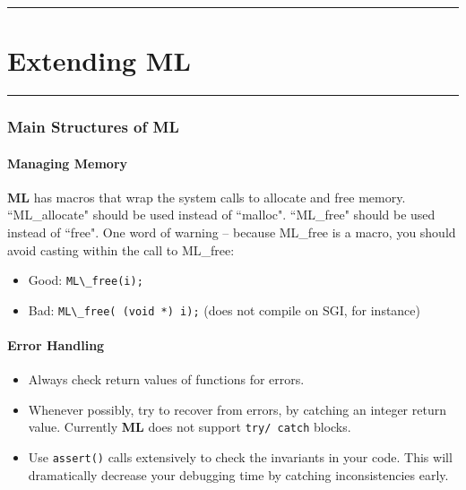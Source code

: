 \documentclass[10pt,letter,relax]{SANDreport}
\newcommand{\HRule}{\noindent\rule{\linewidth}{1mm}}
\newcommand{\ML}     {{\bf ML }}
\begin{document}

\clearpage
\newpage

\vspace*{3cm}
\HRule
\part{Extending ML}

\HRule
\clearpage
\newpage


\section{Main Structures of ML}
\label{sec:structures}

\subsection{Managing Memory}

\ML has macros that wrap the system calls to allocate and free memory.
``ML\_allocate" should be used instead of ``malloc".
``ML\_free" should be used instead of ``free".
One word of warning -- because ML\_free is a macro, you should avoid casting
within the call to ML\_free:
\begin{itemize}
\item Good: \verb!ML\_free(i);!
\item Bad: \verb!ML\_free( (void *) i);! (does not compile on SGI, for instance)
\end{itemize}


\subsection{Error Handling}

\begin{itemize}
\item Always check return values of functions for errors.
\item Whenever possibly, try to recover from errors, by catching an integer
return value. Currently \ML does not support \verb!try/ catch! blocks.
\item Use \verb!assert()! calls extensively to check the invariants in your
  code. This will dramatically decrease your debugging time by catching
  inconsistencies early.
\end{itemize}
\end{document}
